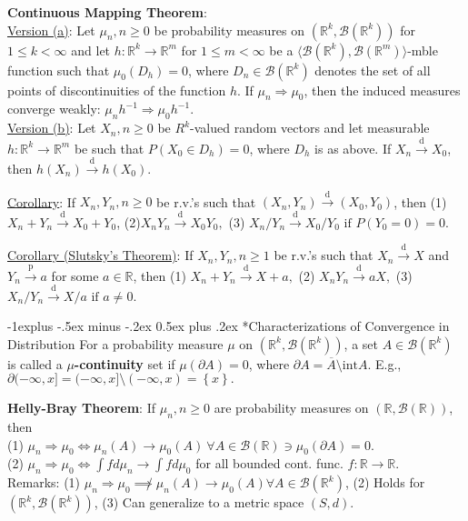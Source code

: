 \documentclass[paper=letter,fontsize=2.89mm]{scrartcl}
\makeatletter
\newcommand{\convdist}{\stackrel{\text{d}}{\longrightarrow}}
\newcommand{\convprob}{\stackrel{\text{p}}{\longrightarrow}}
\newcommand{\Borel}{\mathcal{B}}
\newcommand{\R}{\mathbb{R}}
\newcommand\set[1]{\left\{ #1 \right\}}
\renewcommand{\subsection}{\@startsection{subsection}{2}{0mm}%
                                {-1explus -.5ex minus -.2ex}%
                                {0.5ex plus .2ex}%
                                {\normalfont\normalsize\bfseries}}
\makeatother
\begin{document}
\begin{multicols*}{3}
\textbf{Continuous Mapping Theorem}: \\
\underline{Version (a)}: Let $\mu_n, n \ge0$ be probability measures on $(\R^k, \Borel(\R^k))$ for $1 \le k < \infty$ and let $h: \R^k \to \R^m$ for $1 \le m < \infty$ be a $\langle \Borel(\R^k), \Borel(\R^m) \rangle$-mble function such that $\mu_0(D_h)  = 0$, where $D_n \in \Borel(\R^k)$ denotes the set of all points of discontinuities of the function $h$. If $\mu_n \Rightarrow \mu_0$, then the induced measures converge weakly: $\mu_n h^{-1} \Rightarrow \mu_0 h^{-1}.$ \\
\underline{Version (b)}: Let $X_n, n \ge 0$ be $R^k$-valued random vectors and let measurable $h: \R^k \to \R^m$ be such that $P(X_0 \in D_h) = 0$, where $D_h$ is as above. If $X_n \convdist X_0$, then
$h(X_n) \convdist h(X_0).$ \\ \medskip

\underline{Corollary}: If $X_n, Y_n, n \ge 0$ be r.v.'s such that $(X_n, Y_n) \convdist (X_0, Y_0)$, then (1) $X_n + Y_n \convdist X_0 + Y_0$, (2)$ X_nY_n \convdist X_0Y_0, $ (3) $ X_n/Y_n \convdist X_0/Y_0 \text{ if } P(Y_0 = 0) = 0.$ \\ \medskip

\underline{Corollary (Slutsky's Theorem)}: If $X_n, Y_n, n \ge 1$ be r.v.'s such that $X_n \convdist X$ and $Y_n \convprob a$ for some $a \in \R$, then
(1) $X_n + Y_n \convdist X + a, $ (2) $ X_nY_n \convdist aX, $ (3) $ X_n/Y_n \convdist X/a \text{ if } a \ne 0.$ \\ \medskip

\subsection*{Characterizations of Convergence in Distribution}
For a probability measure $\mu$ on $(\R^k, \Borel(\R^k))$, a set $A \in \Borel(\R^k)$ is called a \textbf{$\mu$-continuity} set if $\mu(\partial A) = 0$, where $\partial A = \overline{A} \setminus \text{int}A$. E.g., $\partial (-\infty, x] = (-\infty, x] \setminus (-\infty, x) = \set{x}.$ \\ \medskip

\textbf{Helly-Bray Theorem}: If $\mu_n, n\ge0$ are probability measures on $(\R, \Borel(\R))$, then  \\
(1) $\mu_n \Rightarrow \mu_0 \iff \mu_n(A) \to \mu_0(A) ~\forall A \in \Borel(\R) \ni \mu_0(\partial A) = 0.$ \\
(2) $\mu_n \Rightarrow \mu_0 \iff \int fd\mu_n \to \int f d\mu_0$ for all bounded cont. func. $f: \R \to \R$. \\
Remarks: 
(1) $\mu_n \Rightarrow \mu_0 \not\implies \mu_n(A) \to \mu_0(A) \forall A \in \Borel(\R^k)$, 
(2) Holds for $(\R^k, \Borel(\R^k))$,
(3) Can generalize to a metric space $(S,d)$. \\ \medskip


\end{multicols*}
\end{document}
